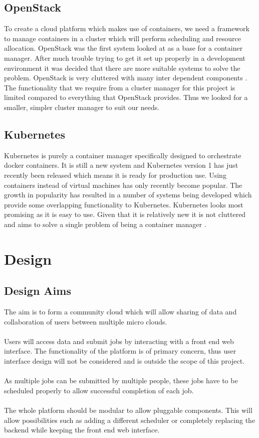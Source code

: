 \documentclass{sig-alternate-05-2015}
\begin{document}
\subsection{OpenStack}
To create a cloud platform which makes use of containers, we need a framework to manage containers in a cluster which will perform scheduling and resource allocation. OpenStack was the first system looked at as a base for a container manager. After much trouble trying to get it set up properly in a development environment it was decided that there are more suitable systems to solve the problem. OpenStack is very cluttered with many inter dependent components \cite{affetti2015adock}. The functionality that we require from a cluster manager for this project is limited compared to everything that OpenStack provides. Thus we looked for a smaller, simpler cluster manager to suit our needs.


\subsection{Kubernetes}
Kubernetes is purely a container manager specifically designed to orchestrate docker containers. It is still a new system and Kubernetes version 1 has just recently been released which means it is ready for production use. Using containers instead of virtual machines has only recently become popular. The growth in popularity has resulted in a number of systems being developed which provide some overlapping functionality to Kubernetes. Kubernetes looks most promising as it is easy to use. Given that it is relatively new it is not cluttered and aims to solve a single problem of being a container manager \cite{googleborg}. 


\section{Design}


\subsection{Design Aims}
The aim is to form a community cloud which will allow sharing of data and collaboration of users between multiple micro clouds.
\\\\
Users will access data and submit jobs by interacting with a front end web interface. The functionality of the platform is of primary concern, thus user interface design will not be considered and is outside the scope of this project. 
\\\\
As multiple jobs can be submitted by multiple people, these jobs have to be scheduled properly to allow successful completion of each job. 
\\\\
The whole platform should be modular to allow pluggable components. This will allow possibilities such as adding a different scheduler or completely replacing the backend while keeping the front end web interface.
\end{document}
